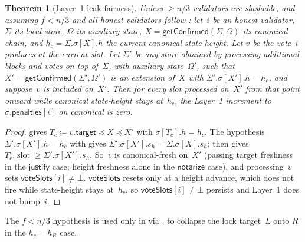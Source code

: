 \ifx\litemode\undefined\documentclass{article}\fi
\newcommand{\slot}[0]{\ensuremath{\operatorname{\mathrm{slot}}}}
\newcommand{\target}{\mathsf{target}}
\newcommand{\just}{\ensuremath{\mathsf{justify}}\xspace}
\newcommand{\notar}{\ensuremath{\mathsf{notarize}}\xspace}
\newcommand{\voteSlots}{\mathsf{voteSlots}}
\newcommand{\penalties}{\mathsf{penalties}}
\newcommand{\getConfirmed}{\textsf{getConfirmed}\xspace}
\theoremstyle{plain}
\newtheorem{theorem}{Theorem}
\theoremstyle{definition}
\theoremstyle{remark}
\begin{document}
\begin{theorem}[Layer~1 leak fairness]\label{thm:fairness}
Unless $\geq n/3$ validators are slashable, and assuming $f < n/3$ and all honest validators follow : let~$i$ be an honest validator, $\Sigma$ its local store, $\Omega$ its auxiliary state, $X = \getConfirmed(\Sigma, \Omega)$ its canonical chain, and $h_c = \Sigma.\sigma[X].h$ the current canonical state-height.
Let $v$ be the vote~$i$ produces at the current slot.
Let $\Sigma'$ be any store obtained by processing additional blocks and votes on top of~$\Sigma$, with auxiliary state~$\Omega'$, such that $X' = \getConfirmed(\Sigma', \Omega')$ is an extension of~$X$ with $\Sigma'.\sigma[X'].h = h_c$, and suppose~$v$ is included on~$X'$.
Then for every slot processed on~$X'$ from that point onward while canonical state-height stays at~$h_c$, the Layer~1 increment to $\sigma.\penalties[i]$ on canonical is zero.
\end{theorem}

\begin{proof}
 gives $T_c \coloneqq v.\target \preceq X \preceq X'$ with $\sigma[T_c].h = h_c$.
The hypothesis $\Sigma'.\sigma[X'].h = h_c$ with  gives $\Sigma'.\sigma[X'].s_h = \Sigma.\sigma[X].s_h$;  then gives $T_c.\slot \geq \Sigma'.\sigma[X'].s_h$.
So~$v$ is canonical-fresh on~$X'$ (passing target freshness in the \just case; height freshness alone in the \notar case), and processing~$v$ sets $\voteSlots[i] \neq \bot$.
$\voteSlots$ resets only at a height advance, which does not fire while state-height stays at~$h_c$, so $\voteSlots[i] \neq \bot$ persists and Layer~1 does not bump~$i$.
\end{proof}

The $f < n/3$ hypothesis is used only in  via , to collapse the lock target~$L$ onto $R$ in the $h_c = h_R$ case.
\end{document}
